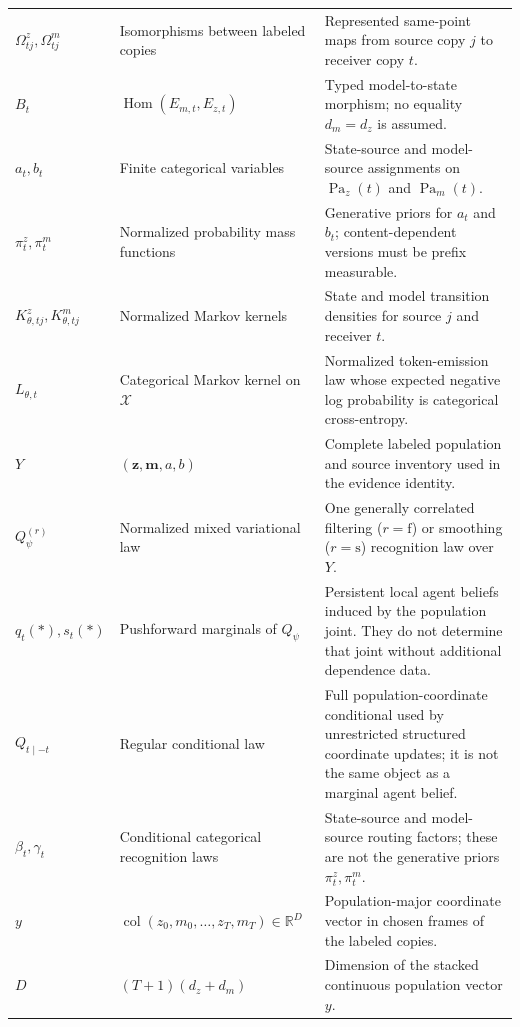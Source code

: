 {\begin{longtable}{>{\raggedright\arraybackslash}p{} >{\raggedright\arraybackslash}p{} >{\raggedright\arraybackslash}p{}}
\addlinespace
$\Omega^z_{tj},\Omega^m_{tj}$ & Isomorphisms between labeled copies & Represented same-point maps from source copy $j$ to receiver copy $t$. \\
\addlinespace
$B_t$ & $\operatorname{Hom}(E_{m,t},E_{z,t})$ & Typed model-to-state morphism; no equality $d_m=d_z$ is assumed. \\
\addlinespace
$a_t,b_t$ & Finite categorical variables & State-source and model-source assignments on $\operatorname{Pa}_z(t)$ and $\operatorname{Pa}_m(t)$. \\
\addlinespace
$\pi_t^z,\pi_t^m$ & Normalized probability mass functions & Generative priors for $a_t$ and $b_t$; content-dependent versions must be prefix measurable. \\
\addlinespace
$K^z_{\theta,tj},K^m_{\theta,tj}$ & Normalized Markov kernels & State and model transition densities for source $j$ and receiver $t$. \\
\addlinespace
$L_{\theta,t}$ & Categorical Markov kernel on $\mathcal X$ & Normalized token-emission law whose expected negative log probability is categorical cross-entropy. \\
\addlinespace
$Y$ & $(\boldsymbol z,\boldsymbol m,a,b)$ & Complete labeled population and source inventory used in the evidence identity. \\
\addlinespace
$Q_\psi^{(r)}$ & Normalized mixed variational law & One generally correlated filtering ($r=\mathrm f$) or smoothing ($r=\mathrm s$) recognition law over $Y$. \\
\addlinespace
$q_t(\ast),s_t(\ast)$ & Pushforward marginals of $Q_\psi$ & Persistent local agent beliefs induced by the population joint. They do not determine that joint without additional dependence data. \\
\addlinespace
$Q_{t\mid -t}$ & Regular conditional law & Full population-coordinate conditional used by unrestricted structured coordinate updates; it is not the same object as a marginal agent belief. \\
\addlinespace
$\beta_t,\gamma_t$ & Conditional categorical recognition laws & State-source and model-source routing factors; these are not the generative priors $\pi_t^z,\pi_t^m$. \\
\addlinespace
$y$ & $\operatorname{col}(z_0,m_0,\ldots,z_T,m_T)\in\mathbb R^D$ & Population-major coordinate vector in chosen frames of the labeled copies. \\
\addlinespace
$D$ & $(T+1)(d_z+d_m)$ & Dimension of the stacked continuous population vector $y$. \\

\end{longtable}}
